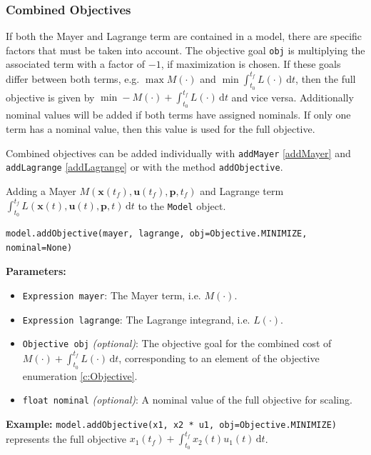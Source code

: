 \documentclass[12pt]{article}
\newcommand{\dd}{\mathrm{d}}
\renewcommand{\v}{\bm}
\begin{document}
	\subsubsection{Combined Objectives}
	
	If both the Mayer and Lagrange term are contained in a model, there are specific factors that must be taken into account. The objective goal \texttt{obj} is multiplying the associated term with a factor of $-1$, if maximization is chosen. If these goals differ between both terms, e.g. $\max M(\cdot)$ and $\min  \int_{t_0}^{t_f} L(\cdot) \, \dd t$, then the full objective is given by $\min -M(\cdot) + \int_{t_0}^{t_f} L(\cdot) \, \dd t$ and vice versa. Additionally nominal values will be added if both terms have assigned nominals. If only one term has a nominal value, then this value is used for the full objective.
	
	Combined objectives can be added individually with \texttt{addMayer} \ref{addMayer} and \texttt{addLagrange} \ref{addLagrange} or with the method \texttt{addObjective}.
	
	
	
	\begin{mdframed}[backgroundcolor=gray!10, roundcorner=10pt, linewidth=1pt]
		
		Adding a Mayer $M(\v{x}(t_f), \v{u}(t_f), \v{p}, t_f)$ and Lagrange term $\int_{t_0}^{t_f} L(\v{x}(t), \v{u}(t), \v{p}, t) \, \mathrm{d}t$ to the \texttt{Model} object.
		
		\begin{lstlisting}
model.addObjective(mayer, lagrange, obj=Objective.MINIMIZE, nominal=None)
		\end{lstlisting}
		\label{addObjective}
		\textbf{Parameters:}
		\begin{itemize} 
			\item \texttt{Expression mayer}: The Mayer term, i.e. $M(\cdot)$.
			\item \texttt{Expression lagrange}: The Lagrange integrand, i.e. $L(\cdot)$.
			\item \texttt{Objective obj} \emph{(optional)}: The objective goal for the combined cost of $M(\cdot) +  \int_{t_0}^{t_f} L(\cdot) \, \dd t$, corresponding to an element of the objective enumeration \ref{c:Objective}.
			\item \texttt{float nominal} \emph{(optional)}: A nominal value of the full objective for scaling.
		\end{itemize}
		
		\textbf{Example:} \texttt{model.addObjective(x1, x2 * u1, obj=Objective.MINIMIZE)} represents the full objective
		$x_1(t_f) + \int_{t_0}^{t_f} x_2(t) u_1(t) \, \mathrm{d}t$.
	\end{mdframed}
\end{document}
